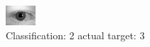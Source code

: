 \begin{figure}[h!]
\begin{center}
\includegraphics[width=0.60\columnwidth]{figures/ID651_class_2_target_3.png}
\end{center}
\caption{ Classification: 2 actual target: 3}
\label{fig:ID651_class_2_target_3}
\end{figure}
